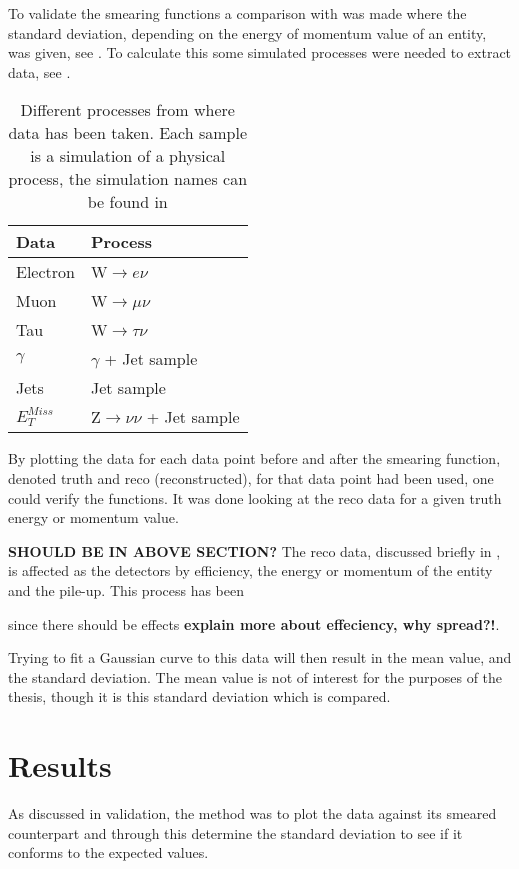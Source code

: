 To validate the smearing functions a comparison with \citep{ATL-PHYS-PUB-2013-004} was made where the standard deviation, depending on the energy of momentum value of an entity, was given, see . To calculate this some simulated processes were needed to extract data, see . 
\begin{SCtable}[][ht]
\begin{tabular}{|l|l|}
\hline
Data & Process \\ \hline
Electron & W$\rightarrow e\nu$ \\
Muon & W$\rightarrow \mu \nu$ \\
Tau & W$\rightarrow \tau \nu$ \\
$\gamma$ & $\gamma$ + Jet sample \\
Jets & Jet sample \\
$E_T^{Miss}$ & Z$\rightarrow \nu \nu$ + Jet sample \\ \hline
\end{tabular}
\caption{Different processes from where data has been taken. Each sample is a simulation of a physical process, the simulation names can be found in }
\label{tab:backproc}
\end{SCtable}


By plotting the data for each data point before and after the smearing function, denoted truth and reco (reconstructed), for that data point had been used, one could verify the functions. It was done looking at the reco data for a given truth energy or momentum value. 

\textbf{SHOULD BE IN ABOVE SECTION?}
The reco data, discussed briefly in , is affected as the detectors by efficiency, the energy or momentum of the entity and the pile-up. This process has been 

 since there should be effects \textbf{explain more about effeciency, why spread?!}. 

Trying to fit a Gaussian curve to this data will then result in the mean value, and the standard deviation. The mean value is not of interest for the purposes of the thesis, though it is this standard deviation which is compared. 


\section{Results}\label{cha:vali:sec:results}
As discussed in validation, the method was to plot the data against its smeared counterpart and through this determine the standard deviation to see if it conforms to the expected values.

